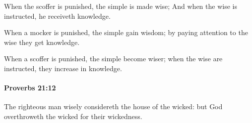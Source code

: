 			\begin{versebox}
					\item[BHS] 
					\item[ASV] When the scoffer is punished, the simple is made wise; And when the wise is instructed, he receiveth knowledge.
					\item[NIV] When a mocker is punished, the simple gain wisdom; by paying attention to the wise they get knowledge.
					\item[NRSV] When a scoffer is punished, the simple become wiser; when the wise are instructed, they increase in knowledge.
			\end{versebox}

		\paragraph{Proverbs 21:12} %
			\label{PROVERBS-21-12}

			The righteous man wisely considereth the house of the wicked: but God overthroweth the wicked for their wickedness.

